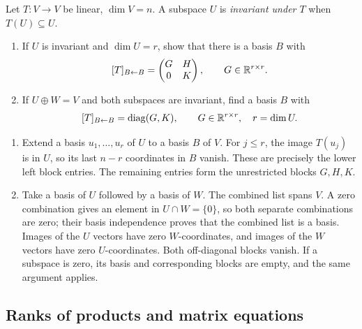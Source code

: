 \begin{problem}\label{ex:04:invariant-blocks}
Let \(T:V\to V\) be linear, \(\dim V=n\).
A subspace \(U\) is \emph{invariant under \(T\)} when \(T(U)\subseteq U\).
\begin{enumerate}
\item If \(U\) is invariant and \(\dim U=r\), show that there is a basis \(B\) with
\[
[T]_{B\leftarrow B}=\begin{pmatrix}G&H\\0&K\end{pmatrix},
\qquad G\in\mathbb R^{r\times r}.
\]
\item If \(U\oplus W=V\) and both subspaces are invariant, find a basis \(B\) with
\[
[T]_{B\leftarrow B}=\operatorname{diag}(G,K),
\qquad G\in\mathbb R^{r\times r},\quad r=\dim U.
\]
\end{enumerate}
\end{problem}
\begin{solution}
\begin{enumerate}
\item Extend a basis \(u_1,\ldots,u_r\) of \(U\) to a basis \(B\) of \(V\).
For \(j\leqslant r\), the image \(T(u_j)\) is in \(U\), so its last \(n-r\)
coordinates in \(B\) vanish. These are precisely the lower left block entries.
The remaining entries form the unrestricted blocks \(G,H,K\).
\item Take a basis of \(U\) followed by a basis of \(W\).
The combined list spans \(V\). A zero combination gives an element in
\(U\cap W=\{0\}\), so both separate combinations are zero;
their basis independence proves that the combined list is a basis.
Images of the \(U\) vectors have zero \(W\)-coordinates, and images of
the \(W\) vectors have zero \(U\)-coordinates. Both off-diagonal blocks vanish.
If a subspace is zero, its basis and corresponding blocks are empty,
and the same argument applies.
\end{enumerate}
\end{solution}

\subsection*{Ranks of products and matrix equations}

